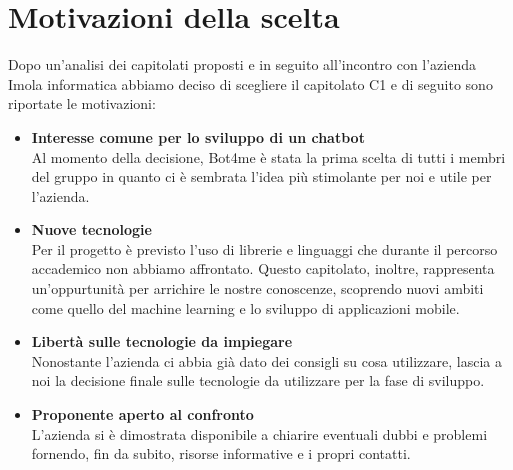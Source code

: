 \section{Motivazioni della scelta}
	Dopo un'analisi dei capitolati proposti e in seguito all'incontro con l'azienda Imola informatica abbiamo deciso di scegliere il capitolato C1 e di seguito sono riportate le motivazioni:
	\begin{itemize}
		\item \textbf{Interesse comune per lo sviluppo di un chatbot}\\ 
            Al momento della decisione, Bot4me è stata la prima scelta di tutti i membri del gruppo in quanto ci è sembrata l'idea più stimolante per noi e utile per l'azienda.
		\item \textbf{Nuove tecnologie}\\ 
            Per il progetto è previsto l'uso di librerie e linguaggi che durante il percorso accademico non abbiamo affrontato. Questo capitolato, inoltre, rappresenta 
            un'oppurtunità per arrichire le nostre conoscenze, scoprendo nuovi ambiti come quello del machine learning e lo sviluppo di applicazioni mobile.
		\item \textbf{Libertà sulle tecnologie da impiegare}\\ 
            Nonostante l'azienda ci abbia già dato dei consigli su cosa utilizzare, lascia a noi la decisione finale sulle tecnologie da utilizzare per la fase di sviluppo. 
		\item \textbf{Proponente aperto al confronto}\\ 
            L'azienda si è dimostrata disponibile a chiarire eventuali dubbi e problemi fornendo, fin da subito, risorse informative e i propri contatti.
	\end{itemize}